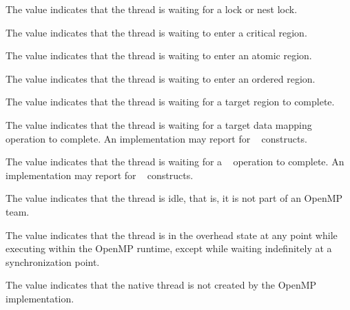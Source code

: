 The value  indicates that the thread is waiting 
for a  lock or nest lock. 

The value  indicates that the thread is 
waiting to enter a critical region. 

The value  indicates that the thread is 
waiting to enter an atomic region. 

The value  indicates that the thread is 
waiting to enter an ordered region. 

The value  indicates that the thread is 
waiting for a target region to complete.

The value  indicates that the thread is 
waiting for a target data mapping operation to complete. An implementation may 
report  for ~ constructs.

The value  indicates that the thread is 
waiting for a ~ operation to complete. An implementation 
may report  for ~ constructs.

The value  indicates that the thread is idle, that  
is, it is not part of an OpenMP team.

The value  indicates that the thread is in the 
overhead state at any point while executing within the OpenMP runtime, 
except while waiting indefinitely at a synchronization point.

The value  indicates that the native thread is 
not created by the OpenMP implementation.

